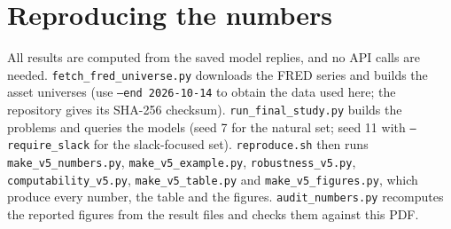 \documentclass[11pt]{article}
\begin{document}
\section{Reproducing the numbers}
\label{app:repro}
{\sloppy All results are computed from the saved model replies, and no API calls are
needed. \texttt{fetch\_fred\_universe.py} downloads the FRED series and builds the asset
universes (use \texttt{--end 2026-10-14} to obtain the data used here; the repository
gives its SHA-256 checksum). \texttt{run\_final\_study.py} builds the problems and queries
the models (seed 7 for the natural set; seed 11 with \texttt{--require\_slack} for the
slack-focused set). \texttt{reproduce.sh} then runs \texttt{make\_v5\_numbers.py},
\texttt{make\_v5\_example.py}, \texttt{robustness\_v5.py}, \texttt{computability\_v5.py},
\texttt{make\_v5\_table.py} and \texttt{make\_v5\_figures.py}, which produce every number,
the table and the figures. \texttt{audit\_numbers.py} recomputes the reported figures from
the result files and checks them against this PDF.\par}
\end{document}

